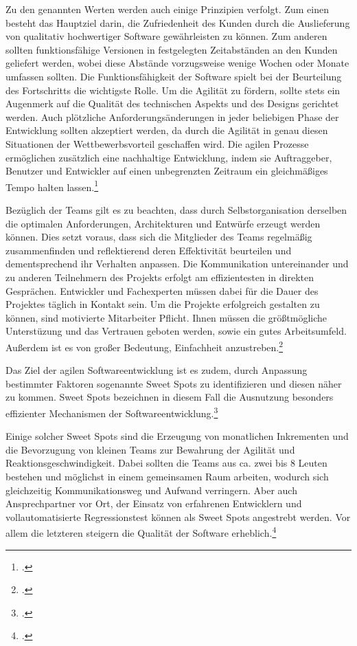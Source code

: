 Zu den genannten Werten werden auch einige Prinzipien verfolgt. Zum einen besteht das Hauptziel darin, die Zufriedenheit des Kunden durch die Auslieferung von qualitativ hochwertiger Software gewährleisten zu können. Zum anderen sollten funktionsfähige Versionen in festgelegten Zeitabständen an den Kunden geliefert werden, wobei diese Abstände vorzugsweise wenige Wochen oder Monate umfassen sollten. Die Funktionsfähigkeit der Software spielt bei der Beurteilung des Fortschritts die wichtigste Rolle. Um die Agilität zu fördern, sollte stets ein Augenmerk auf die Qualität des technischen Aspekts und des Designs gerichtet werden. Auch plötzliche Anforderungsänderungen in jeder beliebigen Phase der Entwicklung sollten akzeptiert werden, da durch die Agilität in genau diesen Situationen der Wettbewerbsvorteil geschaffen wird. Die agilen Prozesse ermöglichen zusätzlich eine nachhaltige Entwicklung, indem sie Auftraggeber, Benutzer und Entwickler auf einen unbegrenzten Zeitraum ein gleichmäßiges Tempo halten lassen.\footcite[Vgl.][]{manifest2}

Bezüglich der Teams gilt es zu beachten, dass durch Selbstorganisation derselben die optimalen Anforderungen, Architekturen und Entwürfe erzeugt werden können. Dies setzt voraus, dass sich die Mitglieder des Teams regelmäßig zusammenfinden und reflektierend deren Effektivität beurteilen und dementsprechend ihr Verhalten anpassen. Die Kommunikation untereinander und zu anderen Teilnehmern des Projekts erfolgt am effizientesten in direkten Gesprächen. Entwickler und Fachexperten müssen dabei für die Dauer des Projektes täglich in Kontakt sein. Um die Projekte erfolgreich gestalten zu können, sind motivierte Mitarbeiter Pflicht. Ihnen müssen die größtmögliche Unterstüzung und das Vertrauen geboten werden, sowie ein gutes Arbeitsumfeld. Außerdem ist es von großer Bedeutung, Einfachheit anzustreben.\footcite[Vgl.][]{manifest2}

Das Ziel der agilen Softwareentwicklung ist es zudem, durch Anpassung bestimmter Faktoren sogenannte Sweet Spots zu identifizieren und diesen näher zu kommen. Sweet Spots bezeichnen in diesem Fall die Ausnutzung besonders effizienter Mechanismen der Softwareentwicklung.\footcite[Vgl.][Seite 178]{cockburn}

Einige solcher Sweet Spots sind die Erzeugung von monatlichen Inkrementen und die Bevorzugung von kleinen Teams zur Bewahrung der Agilität und Reaktionsgeschwindigkeit. Dabei sollten die Teams aus ca. zwei bis 8 Leuten bestehen und möglichst in einem gemeinsamen Raum arbeiten, wodurch sich gleichzeitig Kommunikationsweg und Aufwand verringern. Aber auch Ansprechpartner vor Ort, der Einsatz von erfahrenen Entwicklern und vollautomatisierte Regressionstest können als Sweet Spots angestrebt werden. Vor allem die letzteren steigern die Qualität der Software erheblich.\footcite[Vgl.][Seite 178 ff.]{cockburn}

